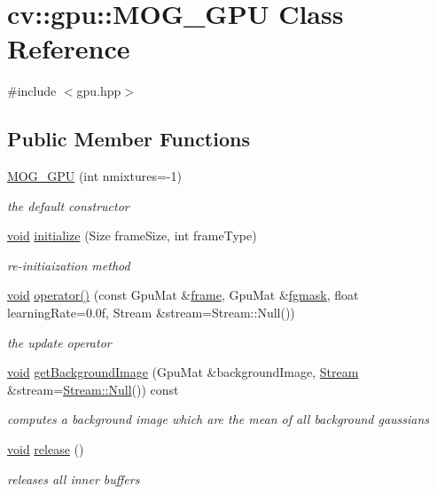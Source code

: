 \hypertarget{classcv_1_1gpu_1_1MOG__GPU}{\section{cv\-:\-:gpu\-:\-:M\-O\-G\-\_\-\-G\-P\-U Class Reference}
\label{classcv_1_1gpu_1_1MOG__GPU}
}


{\ttfamily \#include $<$gpu.\-hpp$>$}

\subsection*{Public Member Functions}
\begin{DoxyCompactItemize}
\item 
\hyperlink{classcv_1_1gpu_1_1MOG__GPU_a13bc014cb6ce08772d970a8aa535b08b}{M\-O\-G\-\_\-\-G\-P\-U} (int nmixtures=-\/1)
\begin{DoxyCompactList}\small\item\em the default constructor \end{DoxyCompactList}\item 
\hyperlink{legacy_8hpp_a8bb47f092d473522721002c86c13b94e}{void} \hyperlink{classcv_1_1gpu_1_1MOG__GPU_a27938bbedae5ef98ecd999790a3365fc}{initialize} (Size frame\-Size, int frame\-Type)
\begin{DoxyCompactList}\small\item\em re-\/initiaization method \end{DoxyCompactList}\item 
\hyperlink{legacy_8hpp_a8bb47f092d473522721002c86c13b94e}{void} \hyperlink{classcv_1_1gpu_1_1MOG__GPU_a6819b06d8135724dea1204248b8c0e9c}{operator()} (const Gpu\-Mat \&\hyperlink{core__c_8h_a0430deaafd9043e478f306e33961299d}{frame}, Gpu\-Mat \&\hyperlink{legacy_8hpp_a7ff9edf5eaa300d3c1cea7de20631fd8}{fgmask}, float learning\-Rate=0.\-0f, Stream \&stream=\-Stream\-::\-Null())
\begin{DoxyCompactList}\small\item\em the update operator \end{DoxyCompactList}\item 
\hyperlink{legacy_8hpp_a8bb47f092d473522721002c86c13b94e}{void} \hyperlink{classcv_1_1gpu_1_1MOG__GPU_acd496ad1374d8365cb742e16d05fe244}{get\-Background\-Image} (Gpu\-Mat \&background\-Image, \hyperlink{classcv_1_1gpu_1_1Stream}{Stream} \&stream=\hyperlink{classcv_1_1gpu_1_1Stream_af96c23564834f88333dcb8997df553f1}{Stream\-::\-Null}()) const 
\begin{DoxyCompactList}\small\item\em computes a background image which are the mean of all background gaussians \end{DoxyCompactList}\item 
\hyperlink{legacy_8hpp_a8bb47f092d473522721002c86c13b94e}{void} \hyperlink{classcv_1_1gpu_1_1MOG__GPU_a20490704fe1e31b805936de14a454d56}{release} ()
\begin{DoxyCompactList}\small\item\em releases all inner buffers \end{DoxyCompactList}\end{DoxyCompactItemize}
